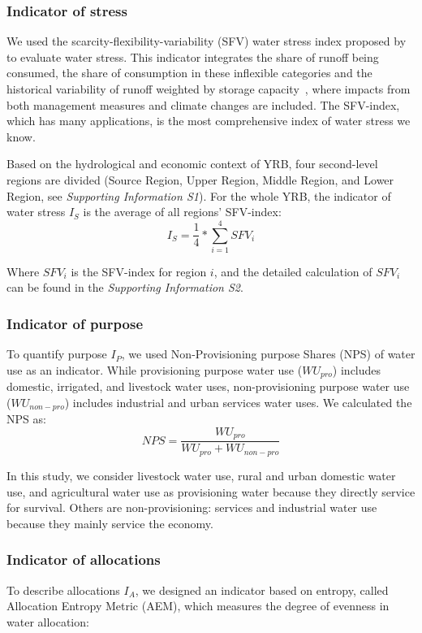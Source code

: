 	\subsubsection*{Indicator of stress}
	We used the scarcity-flexibility-variability (SFV) water stress index proposed by  to evaluate water stress.
	This indicator integrates the share of runoff being consumed, the share of consumption in these inflexible categories and the historical variability of runoff weighted by storage capacity~\cite{qin2019}, where impacts from both management measures and climate changes are included.
	The SFV-index, which has many applications, is the most comprehensive index of water stress we know. %

	Based on the hydrological and economic context of YRB, four second-level regions are divided (Source Region, Upper Region, Middle Region, and Lower Region, see \textit{Supporting Information S1}).
	For the whole YRB, the indicator of water stress $I_S$ is the average of all regions' SFV-index:
	\begin{equation}
		I_S = \frac{1}{4} * \sum_{i=1}^4 SFV_{i}
	\end{equation}

	Where $SFV_i$ is the SFV-index for region $i$, and the detailed calculation of $SFV_i$ can be found in the \textit{Supporting Information S2}.

	\subsubsection*{Indicator of purpose}
	To quantify purpose $I_P$, we used Non-Provisioning purpose Shares (NPS) of water use as an indicator. While provisioning purpose water use ($WU_{pro}$) includes domestic, irrigated, and livestock water uses, non-provisioning purpose water use ($WU_{non-pro}$) includes industrial and urban services water uses. We calculated the NPS as:
	\begin{equation}
		NPS = \frac{WU_{pro}}{WU_{pro} + WU_{non-pro}}
	\end{equation}

	In this study, we consider livestock water use, rural and urban domestic water use, and agricultural water use as provisioning water because they directly service for survival. Others are non-provisioning: services and industrial water use because they mainly service the economy.

	\subsubsection*{Indicator of allocations}
	To describe allocations $I_A$, we designed an indicator based on entropy, called Allocation Entropy Metric (AEM), which measures the degree of evenness in water allocation:

